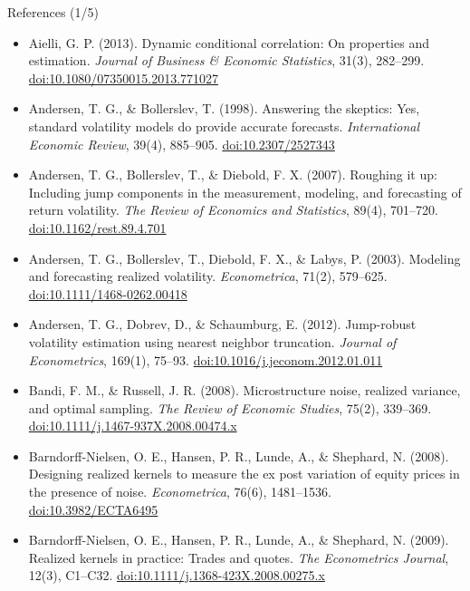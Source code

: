 \begin{frame}{References (1/5)}
\itemsize{\tiny}
\begin{itemize}
    \item Aielli, G. P. (2013). Dynamic conditional correlation: On properties and estimation. \textit{Journal of Business \& Economic Statistics}, 31(3), 282--299. \href{https://doi.org/10.1080/07350015.2013.771027}{doi:10.1080/07350015.2013.771027}
    \item Andersen, T. G., \& Bollerslev, T. (1998). Answering the skeptics: Yes, standard volatility models do provide accurate forecasts. \textit{International Economic Review}, 39(4), 885--905. \href{https://doi.org/10.2307/2527343}{doi:10.2307/2527343}
    \item Andersen, T. G., Bollerslev, T., \& Diebold, F. X. (2007). Roughing it up: Including jump components in the measurement, modeling, and forecasting of return volatility. \textit{The Review of Economics and Statistics}, 89(4), 701--720. \href{https://doi.org/10.1162/rest.89.4.701}{doi:10.1162/rest.89.4.701}
    \item Andersen, T. G., Bollerslev, T., Diebold, F. X., \& Labys, P. (2003). Modeling and forecasting realized volatility. \textit{Econometrica}, 71(2), 579--625. \href{https://doi.org/10.1111/1468-0262.00418}{doi:10.1111/1468-0262.00418}
    \item Andersen, T. G., Dobrev, D., \& Schaumburg, E. (2012). Jump-robust volatility estimation using nearest neighbor truncation. \textit{Journal of Econometrics}, 169(1), 75--93. \href{https://doi.org/10.1016/j.jeconom.2012.01.011}{doi:10.1016/j.jeconom.2012.01.011}
    \item Bandi, F. M., \& Russell, J. R. (2008). Microstructure noise, realized variance, and optimal sampling. \textit{The Review of Economic Studies}, 75(2), 339--369. \href{https://doi.org/10.1111/j.1467-937X.2008.00474.x}{doi:10.1111/j.1467-937X.2008.00474.x}
    \item Barndorff-Nielsen, O. E., Hansen, P. R., Lunde, A., \& Shephard, N. (2008). Designing realized kernels to measure the ex post variation of equity prices in the presence of noise. \textit{Econometrica}, 76(6), 1481--1536. \href{https://doi.org/10.3982/ECTA6495}{doi:10.3982/ECTA6495}
    \item Barndorff-Nielsen, O. E., Hansen, P. R., Lunde, A., \& Shephard, N. (2009). Realized kernels in practice: Trades and quotes. \textit{The Econometrics Journal}, 12(3), C1--C32. \href{https://doi.org/10.1111/j.1368-423X.2008.00275.x}{doi:10.1111/j.1368-423X.2008.00275.x}

\end{itemize}
\end{frame}
